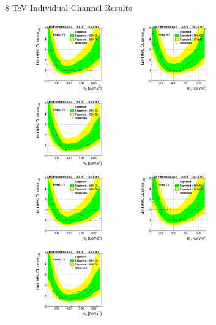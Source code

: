 \begin{frame}{8 TeV Individual Channel Results}
\begin{center}
\includegraphics[width=0.33\textwidth]{images/limit_observed_0-btag_ee.pdf}
\includegraphics[width=0.33\textwidth]{images/limit_observed_1-btag_ee.pdf}
\includegraphics[width=0.33\textwidth]{images/limit_observed_2-btag_ee.pdf}\\
\includegraphics[width=0.33\textwidth]{images/limit_observed_0-btag_mm.pdf}
\includegraphics[width=0.33\textwidth]{images/limit_observed_1-btag_mm.pdf}
\includegraphics[width=0.33\textwidth]{images/limit_observed_2-btag_mm.pdf}\\
\end{center}
\end{frame}




